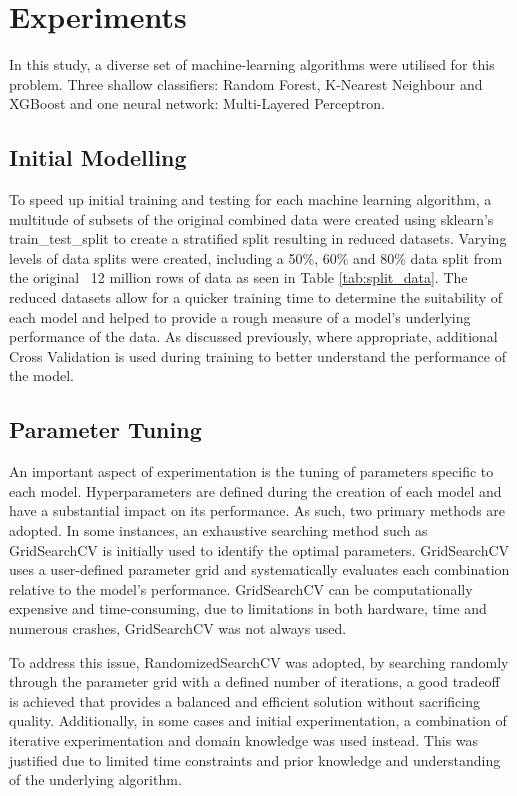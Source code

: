 
\section{Experiments}
\label{sec: Experiments}

In this study, a diverse set of machine-learning algorithms were utilised for this problem. Three shallow classifiers: Random Forest, K-Nearest Neighbour and XGBoost and one neural network: Multi-Layered Perceptron.

\subsection{Initial Modelling}
To speed up initial training and testing for each machine learning algorithm, a multitude of subsets of the original combined data were created using sklearn's train\_test\_split to create a stratified split resulting in reduced datasets. Varying levels of data splits were created, including a 50\%, 60\% and 80\% data split from the original ~12 million rows of data as seen in Table \ref{tab:split_data}. The reduced datasets allow for a quicker training time to determine the suitability of each model and helped to provide a rough measure of a model's underlying performance of the data. As discussed previously, where appropriate, additional Cross Validation is used during training to better understand the performance of the model.


\subsection{Parameter Tuning} 
An important aspect of experimentation is the tuning of parameters specific to each model. Hyperparameters are defined during the creation of each model and have a substantial impact on its performance. As such, two primary methods are adopted. In some instances, an exhaustive searching method such as GridSearchCV is initially used to identify the optimal parameters. GridSearchCV uses a user-defined parameter grid and systematically evaluates each combination relative to the model's performance. GridSearchCV can be computationally expensive and time-consuming, due to limitations in both hardware, time and numerous crashes, GridSearchCV was not always used. 

\smallskip

To address this issue, RandomizedSearchCV was adopted, by searching randomly through the parameter grid with a defined number of iterations, a good tradeoff is achieved that provides a balanced and efficient solution without sacrificing quality. Additionally, in some cases and initial experimentation, a combination of iterative experimentation and domain knowledge was used instead. This was justified due to limited time constraints and prior knowledge and understanding of the underlying algorithm. 

